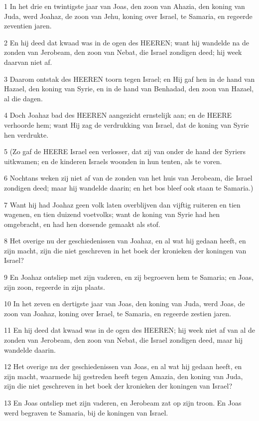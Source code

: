 \par 1 In het drie en twintigste jaar van Joas, den zoon van Ahazia, den koning van Juda, werd Joahaz, de zoon van Jehu, koning over Israel, te Samaria, en regeerde zeventien jaren.
\par 2 En hij deed dat kwaad was in de ogen des HEEREN; want hij wandelde na de zonden van Jerobeam, den zoon van Nebat, die Israel zondigen deed; hij week daarvan niet af.
\par 3 Daarom ontstak des HEEREN toorn tegen Israel; en Hij gaf hen in de hand van Hazael, den koning van Syrie, en in de hand van Benhadad, den zoon van Hazael, al die dagen.
\par 4 Doch Joahaz bad des HEEREN aangezicht ernstelijk aan; en de HEERE verhoorde hem; want Hij zag de verdrukking van Israel, dat de koning van Syrie hen verdrukte.
\par 5 (Zo gaf de HEERE Israel een verlosser, dat zij van onder de hand der Syriers uitkwamen; en de kinderen Israels woonden in hun tenten, als te voren.
\par 6 Nochtans weken zij niet af van de zonden van het huis van Jerobeam, die Israel zondigen deed; maar hij wandelde daarin; en het bos bleef ook staan te Samaria.)
\par 7 Want hij had Joahaz geen volk laten overblijven dan vijftig ruiteren en tien wagenen, en tien duizend voetvolks; want de koning van Syrie had hen omgebracht, en had hen dorsende gemaakt als stof.
\par 8 Het overige nu der geschiedenissen van Joahaz, en al wat hij gedaan heeft, en zijn macht, zijn die niet geschreven in het boek der kronieken der koningen van Israel?
\par 9 En Joahaz ontsliep met zijn vaderen, en zij begroeven hem te Samaria; en Joas, zijn zoon, regeerde in zijn plaats.
\par 10 In het zeven en dertigste jaar van Joas, den koning van Juda, werd Joas, de zoon van Joahaz, koning over Israel, te Samaria, en regeerde zestien jaren.
\par 11 En hij deed dat kwaad was in de ogen des HEEREN; hij week niet af van al de zonden van Jerobeam, den zoon van Nebat, die Israel zondigen deed, maar hij wandelde daarin.
\par 12 Het overige nu der geschiedenissen van Joas, en al wat hij gedaan heeft, en zijn macht, waarmede hij gestreden heeft tegen Amazia, den koning van Juda, zijn die niet geschreven in het boek der kronieken der koningen van Israel?
\par 13 En Joas ontsliep met zijn vaderen, en Jerobeam zat op zijn troon. En Joas werd begraven te Samaria, bij de koningen van Israel.
